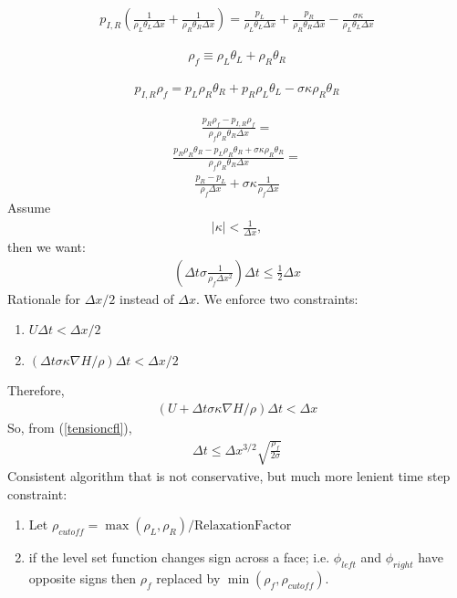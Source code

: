 \documentclass[preprint,12pt]{Definitions/elsarticle}
\begin{document}
\begin{enumerate}
\begin{eqnarray*}
p_{I,R}\left( 
\frac{1}{\rho_{L}\theta_{L}\Delta x}+
\frac{1}{\rho_{R}\theta_{R}\Delta x} \right)=
\frac{p_{L}}{\rho_{L}\theta_{L}\Delta x}+
\frac{p_{R}}{\rho_{R}\theta_{R}\Delta x}-
\frac{\sigma\kappa}{\rho_{L}\theta_{L}\Delta x}
\end{eqnarray*}

\begin{eqnarray*}
\rho_{f}\equiv \rho_{L}\theta_{L}+\rho_{R}\theta_{R}
\end{eqnarray*}

\begin{eqnarray*}
p_{I,R}\rho_{f}=
p_{L}\rho_{R}\theta_{R}+
p_{R}\rho_{L}\theta_{L}-\sigma\kappa\rho_{R}\theta_{R}
\end{eqnarray*}

\begin{eqnarray*}
\frac{p_{R}\rho_{f}-p_{I,R}\rho_{f}}{\rho_{f}\rho_{R}\theta_{R}\Delta x}=
\end{eqnarray*}
\begin{eqnarray*}
\frac{p_{R}\rho_{R}\theta_{R}-p_{L}\rho_{R}\theta_{R}+
 \sigma\kappa\rho_{R}\theta_{R}}{\rho_{f}\rho_{R}\theta_{R}\Delta x}=
\end{eqnarray*}
\begin{eqnarray*}
\frac{p_{R}-p_{L}}{\rho_{f}\Delta x}+\sigma\kappa\frac{1}{\rho_{f}\Delta x}
\end{eqnarray*}
Assume
\begin{eqnarray*}
|\kappa|<\frac{1}{\Delta x},
\end{eqnarray*}
then we want:
\begin{eqnarray}
\left(\Delta t \sigma\frac{1}{\rho_{f}\Delta x^{2}}\right)\Delta t \le 
	\frac{1}{2}\Delta x \label{tensioncfl}
\end{eqnarray}
Rationale for $\Delta x/2$ instead of $\Delta x$.  We enforce two constraints:
\begin{enumerate}
	\item $U\Delta t<\Delta x/2$
	\item $(\Delta t\sigma\kappa\nabla H/\rho)\Delta t<\Delta x/2$
\end{enumerate}
Therefore,
\begin{eqnarray*}
 \left(U+\Delta t\sigma\kappa\nabla H/\rho\right)\Delta t<\Delta x
\end{eqnarray*}
So, from (\ref{tensioncfl}),
\begin{eqnarray*}
\Delta t \le \Delta x^{3/2} \sqrt{\frac{\rho_{f}}{2\sigma}}
\end{eqnarray*}
Consistent algorithm that is not conservative, but much more lenient time step
constraint:
\begin{enumerate}
	\item Let 
		$\rho_{cutoff}=\max(\rho_{L},\rho_{R})/\mbox{RelaxationFactor}$
	\item if the level set function changes sign across a face; i.e. 
		$\phi_{left}$ and $\phi_{right}$ have opposite signs then
		$\rho_{f}$ replaced by $\min(\rho_{f},\rho_{cutoff})$.
\end{enumerate}


\end{enumerate}
\end{document}
